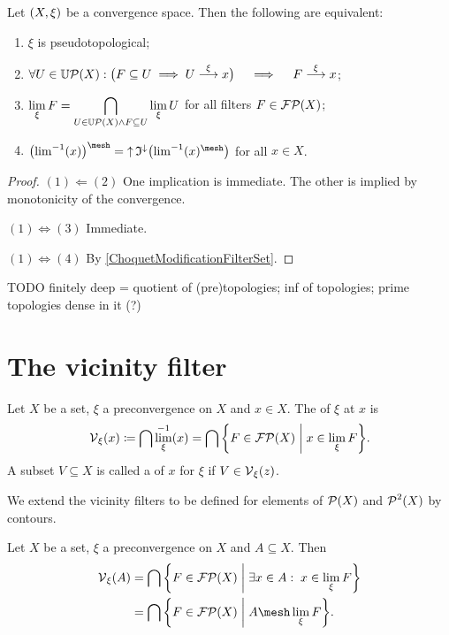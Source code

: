 \begin{lemma} \label{pseudotopologicalConditions}
Let $\sSet{X, \xi}$ be a convergence space. Then the following are equivalent:
\begin{enumerate}
\item $\xi$ is pseudotopological;
\item $\forall U\in \operatorname{\mathbb{U}\mathcal{P}}(X): \big( F\subseteq U \implies U \overset{\xi}{\longrightarrow} x\big) \quad\implies\quad F \overset{\xi}{\longrightarrow} x$;
\item $\displaystyle\lim_\xi F = \bigcap_{U\in \operatorname{\mathbb{U}\mathcal{P}}(X)\land F \subseteq U}\lim_\xi U$ for all filters $F\in \operatorname{\mathcal{FP}}(X)$;
\item $\big({\lim}^{-1}(x)\big)^\mesh = \upset\mathfrak{I}^{\imf}\big({\lim}^{-1}(x)^\mesh\big)$ for all $x\in X$.
\end{enumerate}
\end{lemma}
\begin{proof}
$(1) \Leftarrow (2)$ One implication is immediate. The other is implied by monotonicity of the convergence.

$(1)\Leftrightarrow (3)$ Immediate.

$(1)\Leftrightarrow (4)$ By \ref{ChoquetModificationFilterSet}.
\end{proof}

TODO finitely deep = quotient of (pre)topologies; inf of topologies; prime topologies dense in it (?)



\section{The vicinity filter}
\begin{definition}
Let $X$ be a set, $\xi$ a preconvergence on $X$ and $x\in X$. The  of $\xi$ at $x$ is
\[ \vicinities_\xi(x) \defeq \bigcap \lim_\xi^{-1}(x) = \bigcap \setbuilder{F\in \powerfilters(X)}{x\in \lim_\xi F}. \]
A subset $V\subseteq X$ is called a  of $x$ for $\xi$ if $V\in \operatorname{\mathcal{V}}_\xi(z)$.

We extend the vicinity filters to be defined for elements of $\operatorname{\mathcal{P}}(X)$ and $\operatorname{\mathcal{P}}^2(X)$ by contours.
\end{definition}

\begin{lemma}
Let $X$ be a set, $\xi$ a preconvergence on $X$ and $A\subseteq X$. Then
\begin{align*}
\vicinities_\xi(A) &= \bigcap \setbuilder{F\in \powerfilters(X)}{\exists x\in A: \; x\in \lim_\xi F} \\
&= \bigcap \setbuilder{F\in \powerfilters(X)}{A \mesh \lim_\xi F}.
\end{align*}
\end{lemma}

